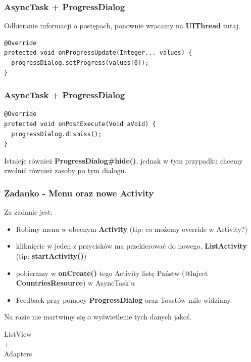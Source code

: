 \documentclass{beamer}
\begin{document}
\begin{frame}[fragile]\frametitle{AsyncTask + ProgressDialog}
Odbieranie informacji o postępach, ponownie wracamy na \textbf{UIThread} tutaj.
\begin{lstlisting}
@Override
protected void onProgressUpdate(Integer... values) {
  progressDialog.setProgress(values[0]);
}
\end{lstlisting}
\end{frame}

\begin{frame}[fragile]\frametitle{AsyncTask + ProgressDialog}
\begin{lstlisting}
@Override
protected void onPostExecute(Void aVoid) {
  progressDialog.dismiss();
}
\end{lstlisting}
Istnieje również \textbf{ProgressDialog\#hide()}, jednak w tym 
przypadku chcemy zwolnić również zasoby po tym dialogu.
\end{frame}

\begin{frame}\frametitle{Zadanko - Menu oraz nowe Activity}
Za zadanie jest:
\begin{itemize}
 \item Robimy menu w obecnym \textbf{Activity} (tip: co możemy override w Activity?)
 \pause \item kliknięcie w jeden z przycisków ma przekierować do nowego, \textbf{ListActivity} (tip: \textbf{startActivity()})
 \pause \item pobieramy w \textbf{onCreate()} tego Activity listę Państw (@Inject \textbf{CountriesResource}) w AsyncTask'u
 \pause \item Feedback przy pomocy \textbf{ProgressDialog} oraz Toastów mile widziany.
\end{itemize}
Na razie nie martwimy się o wyświetlenie tych danych jakoś.
\end{frame}


\begin{frame}
\begin{center}
 \Huge{ListView} \\ 
 \Huge{+} \\
 \Huge{Adapters}
\end{center}
\end{frame}
\end{document}

